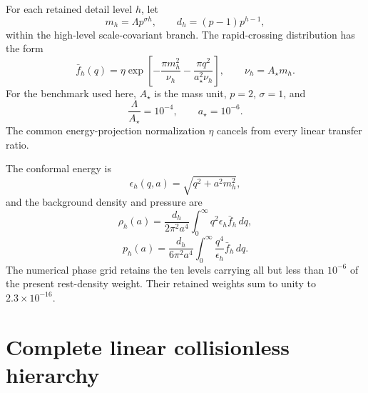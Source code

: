 For each retained detail level $h$, let
\begin{equation}
 m_h=\Lambda p^{\sigma h},
 \qquad
 d_h=(p-1)p^{h-1},
 \label{eq:cb-level-data}
\end{equation}
within the high-level scale-covariant branch.  The rapid-crossing distribution has the form
\begin{equation}
 \bar f_h(q)
 =\eta\exp\left[-\frac{\pi m_h^2}{\nu_h}
 -\frac{\pi q^2}{a_\star^2\nu_h}\right],
 \qquad
 \nu_h=A_\star m_h.
 \label{eq:cb-background-distribution}
\end{equation}
For the benchmark used here, $A_\star$ is the mass unit, $p=2$, $\sigma=1$, and
\begin{equation}
 \frac{\Lambda}{A_\star}=10^{-4},
 \qquad
 a_\star=10^{-6}.
 \label{eq:cb-benchmark-production}
\end{equation}
The common energy-projection normalization $\eta$ cancels from every linear transfer ratio.

The conformal energy is
\begin{equation}
 \epsilon_h(q,a)=\sqrt{q^2+a^2m_h^2},
 \label{eq:cb-conformal-energy}
\end{equation}
and the background density and pressure are
\begin{equation}
 \rho_h(a)
 =\frac{d_h}{2\pi^2a^4}
 \int_0^\infty q^2\epsilon_h\bar f_h\,dq,
 \label{eq:cb-background-density}
\end{equation}
\begin{equation}
 p_h(a)
 =\frac{d_h}{6\pi^2a^4}
 \int_0^\infty \frac{q^4}{\epsilon_h}\bar f_h\,dq.
 \label{eq:cb-background-pressure}
\end{equation}
The numerical phase grid retains the ten levels carrying all but less than $10^{-6}$ of the present rest-density weight.  Their retained weights sum to unity to $2.3\times10^{-16}$.

\section{Complete linear collisionless hierarchy}

